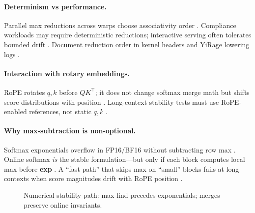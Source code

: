 \paragraph{Determinism vs performance.} Parallel max reductions across warps choose associativity order \citep{nvidia2022hopper,chen2020compilerbasedhardw}. Compliance workloads may require deterministic reductions; interactive serving often tolerates bounded drift \citep{patel2025llminference,dlbook}. Document reduction order in kernel headers and YiRage lowering logs \citep{yirage2026}.

\paragraph{Interaction with rotary embeddings.} RoPE rotates $q,k$ before $QK^\top$; it does not change softmax merge math but shifts score distributions with position \citep{liu2024deepseekv3,kwon2023vllm}. Long-context stability tests must use RoPE-enabled references, not static $q,k$ \citep{dao2023flashdecoding,patel2025llminference}.


\paragraph{Why max-subtraction is non-optional.} Softmax exponentials overflow in FP16/BF16 without subtracting row max \citep{dlbook,patel2025llminference}. Online softmax \emph{is} the stable formulation---but only if each block computes local max before \textbf{exp} \citep{dao2022flashattention}. A ``fast path'' that skips max on ``small'' blocks fails at long contexts when score magnitudes drift with RoPE position \citep{dao2023flashdecoding,memoryfloor2026}.


\begin{figure}[t]
\centering
{}
\caption{Numerical stability path: max-find precedes exponentials; merges preserve online invariants.}
\label{fig:numerical_stability_architecture}
\end{figure}

